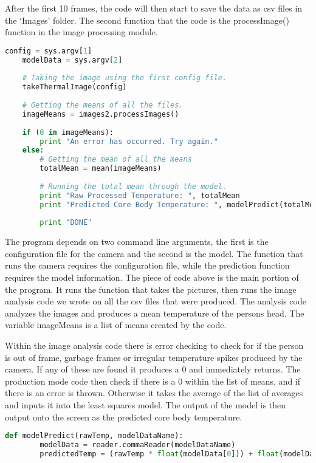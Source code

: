 	After the first 10 frames, the code will then start to save the data as csv files in the ‘Images’ folder. The second function that the code is the processImage() function in the image processing module.
	
	\begin{lstlisting}[language=Python, caption=Prodiction Mode]
	config = sys.argv[1]
	modelData = sys.argv[2]
	
	# Taking the image using the first config file.
	takeThermalImage(config)
	
	# Getting the means of all the files.
	imageMeans = images2.processImages()
	
	if (0 in imageMeans):
		print "An error has occurred. Try again."
	else:
		# Getting the mean of all the means
		totalMean = mean(imageMeans)
	
		# Running the total mean through the model.
		print "Raw Processed Temperature: ", totalMean
		print "Predicted Core Body Temperature: ", modelPredict(totalMean, modelData)
		
		print "DONE"
	\end{lstlisting}
	
	The program depends on two command line arguments, the first is the configuration file for the camera and the second is the model. The function that runs the camera requires the configuration file, while the prediction function requires the model information. The piece of code above is the main portion of the program. It runs the function that takes the pictures, then runs the image analysis code we wrote on all the csv files that were produced. The analysis code analyzes the images and produces a mean temperature of the persons head. The variable imageMeans is a list of means created by the code.
	
	Within the image analysis code there is error checking to check for if the person is out of frame, garbage frames or irregular temperature spikes produced by the camera. If any of these are found it produces a 0 and immediately returns. The production mode code then check if there is a 0 within the list of means, and if there is an error is thrown. Otherwise it takes the average of the list of averages and inputs it into the least squares model. The output of the model is then output onto the screen as the predicted core body temperature.
	
	\begin{lstlisting}[language=Python, caption=Prodiction Mode]
	def modelPredict(rawTemp, modelDataName):
		modelData = reader.commaReader(modelDataName)
		predictedTemp = (rawTemp * float(modelData[0])) + float(modelData[1])
	\end{lstlisting}
	
